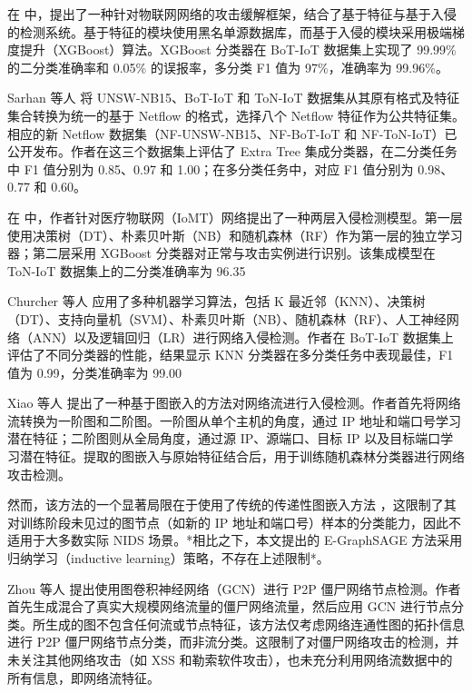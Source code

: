 \documentclass{article}
\begin{document}
在\cite{Mu2020}
中，提出了一种针对物联网网络的攻击缓解框架，结合了基于特征与基于入侵的检测系统。基于特征的模块使用黑名单源数据库，而基于入侵的模块采用极端梯度提升（XGBoost）算法。XGBoost
分类器在 BoT-IoT 数据集上实现了 99.99\% 的二分类准确率和 0.05\% 的误报率，多分类 F1 值为 97\%，准确率为 99.96\%。

Sarhan\cite{Sarhan2021} 等人 将 UNSW-NB15、BoT-IoT 和 ToN-IoT
数据集从其原有格式及特征集合转换为统一的基于 Netflow 的格式，选择八个 Netflow 特征作为公共特征集。相应的新
Netflow 数据集（NF-UNSW-NB15、NF-BoT-IoT 和 NF-ToN-IoT）已公开发布。作者在这三个数据集上评估了
Extra Tree 集成分类器，在二分类任务中 F1 值分别为 0.85、0.97 和 1.00；在多分类任务中，对应 F1 值分别为
0.98、0.77 和 0.60。

在\cite{Kumar2020}
中，作者针对医疗物联网（IoMT）网络提出了一种两层入侵检测模型。第一层使用决策树（DT）、朴素贝叶斯（NB）和随机森林（RF）作为第一层的独立学习器；第二层采用
XGBoost 分类器对正常与攻击实例进行识别。该集成模型在 ToN-IoT 数据集上的二分类准确率为 96.35%

Churcher 等人 \cite{s21020446} 应用了多种机器学习算法，包括 K
最近邻（KNN）、决策树（DT）、支持向量机（SVM）、朴素贝叶斯（NB）、随机森林（RF）、人工神经网络（ANN）以及逻辑回归（LR）进行网络入侵检测。作者在
BoT-IoT 数据集上评估了不同分类器的性能，结果显示 KNN 分类器在多分类任务中表现最佳，F1 值为 0.99，分类准确率为 99.00%

Xiao 等人 \cite{Xiao2020}
提出了一种基于图嵌入的方法对网络流进行入侵检测。作者首先将网络流转换为一阶图和二阶图。一阶图从单个主机的角度，通过 IP
地址和端口号学习潜在特征；二阶图则从全局角度，通过源 IP、源端口、目标 IP
以及目标端口学习潜在特征。提取的图嵌入与原始特征结合后，用于训练随机森林分类器进行网络攻击检测。

然而，该方法的一个显著局限在于使用了传统的传递性图嵌入方法
\cite{hamilton2018inductiverepresentationlearninglarge}，这限制了其对训练阶段未见过的图节点（如新的
IP 地址和端口号）样本的分类能力，因此不适用于大多数实际 NIDS 场景。*相比之下，本文提出的 E-GraphSAGE
方法采用归纳学习（inductive learning）策略，不存在上述限制*。

Zhou 等人 \cite{zhou2020automatingbotnetdetectiongraph}
提出使用图卷积神经网络（GCN）进行 P2P 僵尸网络节点检测。作者首先生成混合了真实大规模网络流量的僵尸网络流量，然后应用 GCN
进行节点分类。所生成的图不包含任何流或节点特征，该方法仅考虑网络连通性图的拓扑信息进行 P2P
僵尸网络节点分类，而非流分类。这限制了对僵尸网络攻击的检测，并未关注其他网络攻击（如 XSS
和勒索软件攻击），也未充分利用网络流数据中的所有信息，即网络流特征。
\end{document}
